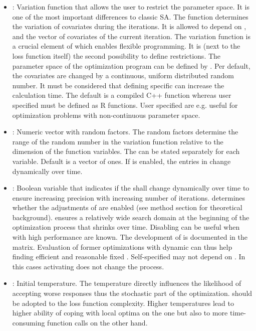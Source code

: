     \begin{itemize}
\item {}:  Variation function that allows the user to restrict the parameter space. It is one of the most important differences to classic SA. The function determines the variation of covariates during the iterations. It is allowed to depend on ,  and the vector of covariates of the current iteration. The variation function is a crucial element of  which enables flexible programming. It is (next to the loss function itself) the second possibility to define restrictions. The parameter space of the optimization program can be defined by . Per default, the covariates are changed by a continuous, uniform distributed random number. It must be considered that defining specific  can increase the calculation time. The default  is a compiled C++ function whereas user specified  must be defined as R functions. User specified are e.g. useful for optimization problems with non-continuous parameter space.
\item {}: Numeric vector with random factors. The random factors determine the range of the random number in the variation function  relative to the dimension of the function variables. The  can be stated separately for each variable. Default is a vector of ones. If  is enabled, the entries in  change dynamically over time.
\item {}: Boolean variable that indicates if the  shall change dynamically over time to ensure increasing precision with increasing number of iterations.  determines whether the adjustments of \citet{corana_1987, pronzato_1984} are enabled (see method section for theoretical background).  ensures a relatively wide search domain at the beginning of the optimization process that shrinks over time. Disabling  can be useful when  with high performance are known. The development of  is documented in the  matrix. Evaluation of former optimizations with dynamic  can thus help finding efficient and reasonable fixed . Self-specified  may not depend on . In this cases activating  does not change the process.
\item {}: Initial temperature. The temperature directly influences the likelihood of accepting worse responses thus the stochastic part of the optimization.  should be adopted to the loss function complexity. Higher temperatures lead to higher ability of coping with local optima on the one but also to more time-consuming function calls on the other hand.

\end{itemize}
